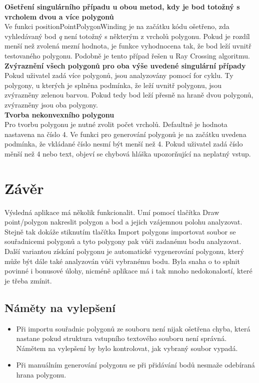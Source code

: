 \documentclass[a4paper,11pt,twoside]{article}
\begin{document}
\noindent\textbf{Ošetření singulárního případu u obou metod, kdy je bod totožný s vrcholem dvou a více polygonů}\\
Ve funkci positionPointPolygonWinding je na začátku kódu ošetřeno, zda vyhledávaný bod \textit{q} není totožný s některým z vrcholů polygonu. Pokud je rozdíl menší než zvolená mezní hodnota, je funkce vyhodnocena tak, že bod leží uvnitř testovaného polygonu. Podobně je tento případ řešen u Ray Crossing algoritmu.\\

\noindent\textbf{Zvýraznění všech polygonů pro oba výše uvedené singulární případy}\\
Pokud uživatel zadá více polygonů, jsou analyzovány pomocí for cyklu. Ty polygony, u kterých je splněna podmínka, že leží uvnitř polygonu, jsou zvýrazněny zelenou barvou. Pokud tedy bod leží přesně na hraně dvou polygonů, zvýrazněny jsou oba polygony.\\

\noindent\textbf{Tvorba nekonvexního polygonu}\\
Pro tvorbu polygonu je nutné zvolit počet vrcholů. Defaultně je hodnota nastavena na číslo 4. Ve funkci pro generování polygonů je na začátku uvedena podmínka, že vkládané číslo nesmí být menší než 4. Pokud uživatel zadá číslo měnší než 4 nebo text, objeví se chybová hláška upozorňující na neplatný vstup.


\newpage
{}

\vspace*{-1cm}
\section{Závěr}
\noindent
\large
Výsledná aplikace má několik funkcionalit. Umí pomocí tlačítka Draw point/polygon nakreslit polygon a bod a jejich vzájemnou polohu analyzovat. Stejně tak dokáže stiknutím tlačítka Import polygons importovat soubor se souřadnicemi polygonů a tyto polygony pak vůči zadanému bodu analyzovat. Další variantou získání polygonu je automatické vygenerování polygonu, který může být dále také analyzován vůči vybranému bodu. Byla snaha o to splnit povinné i bonusové úlohy, nicméně aplikace má i tak mnoho nedokonalostí, které je třeba zmínit.

\subsection{Náměty na vylepšení}
\large
\begin{itemize}
\item Při importu souřadnic polygonů ze souboru není nijak ošetřena chyba, která nastane pokud struktura vstupního textového souboru není správná. Námětem na vylepšení by bylo kontrolovat, jak vybraný soubor vypadá.

\item Při manuálním generování polygonu se při přidávání bodů nesmaže odebíraná hrana polygonu.
\end{itemize}

\newpage
\vspace*{-6ex}
\renewcommand{\refname}{Literatura} 
    
    
 
\end{document}
